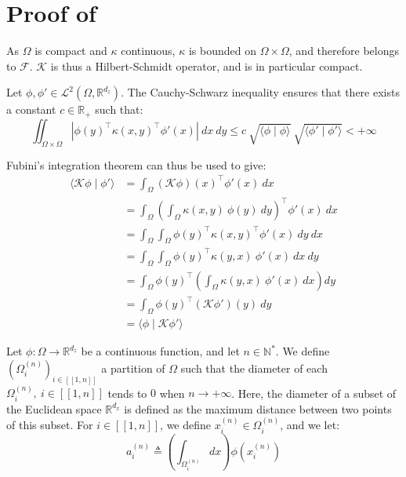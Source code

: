\section[Proof of Proposition 3.15]{Proof of }\label{sec:proof_Mercer_operator}

As $\Omega$ is compact and $\kappa$ continuous, $\kappa$ is bounded on $\Omega\times\Omega$, and therefore belongs to $\mathcal{F}$. $\mathcal{K}$ is thus a Hilbert-Schmidt operator, and is in particular compact.

Let $\phi,\phi'\in\mathcal{L}^2(\Omega,\mathbb{R}^{d_z})$. The Cauchy-Schwarz inequality ensures that there exists a constant $c\in\mathbb{R}_+$ such that:
\begin{equation}
	\iint_{\Omega\times\Omega}{\left|\phi(y)^\top \kappa(x,y)^\top\phi'(x)\right|\:dx\:dy}\leq c\:\sqrt{\langle\phi\mid\phi\rangle}\:\sqrt{\langle\phi'\mid\phi'\rangle}<+\infty
\end{equation}

Fubini's integration theorem \cite{bib:Tonelli} can thus be used to give:
\begin{equation}
	\begin{aligned}
	\langle\mathcal{K}\phi\mid\phi'\rangle&=\int_{\Omega}{(\mathcal{K}\phi)(x)^\top\phi'(x)\:dx}\\
	&=\int_{\Omega}{\left(\int_{\Omega}{\kappa(x,y)\:\phi(y)\:dy}\right)^\top\phi'(x)\:dx}\\
	&=\int_{\Omega}{\int_{\Omega}{\phi(y)^\top \kappa(x,y)^\top\phi'(x)\:dy}\:dx}\\
	&=\int_{\Omega}{\int_{\Omega}{\phi(y)^\top \kappa(y,x)\:\phi'(x)\:dx}\:dy}\\
	&=\int_{\Omega}{\phi(y)^\top\left(\int_{\Omega}{\kappa(y,x)\:\phi'(x)\:dx}\right)dy}\\
	&=\int_{\Omega}{\phi(y)^\top(\mathcal{K}\phi')(y)\:dy}\\
	&=\langle\phi\mid\mathcal{K}\phi'\rangle
	\end{aligned}
\end{equation}

Let $\phi:\Omega\to\mathbb{R}^{d_z}$ be a continuous function, and let $n\in\mathbb{N}^*$. We define $\left(\Omega_i^{(n)}\right)_{i\in[\![1,n]\!]}$ a partition of $\Omega$ such that the diameter of each $\Omega_i^{(n)},\:i\in[\![1,n]\!]$ tends to $0$ when $n\to+\infty$. Here, the diameter of a subset of the Euclidean space $\mathbb{R}^{d_x}$ is defined as the maximum distance between two points of this subset. For $i\in[\![1,n]\!]$, we define $x_i^{(n)}\in\Omega_i^{(n)}$, and we let:
\begin{equation}
	a_i^{(n)}\triangleq\left(\int_{\Omega_i^{(n)}}{dx}\right)\phi\!\left(x_i^{(n)}\right)
\end{equation}

